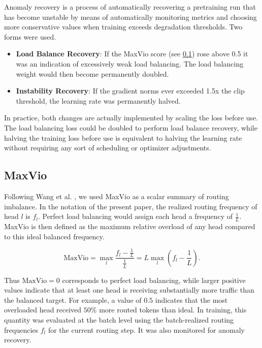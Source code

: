 \documentclass[11pt]{article}
\begin{document}
Anomaly recovery is a process of automatically recovering a pretraining run that has become unstable by means of automatically monitoring metrics and choosing more conservative values when training exceeds degradation thresholds. Two forms were used.

\begin{itemize}
    \item \textbf{Load Balance Recovery}: If the MaxVio score (see \ref{app:maxvio}) rose above 0.5 it was an indication of excessively weak load balancing. The load balancing weight would then become permanently doubled.
    \item \textbf{Instability Recovery}: If the gradient norms ever exceeded 1.5x the clip threshold, the learning rate was permanently halved.
\end{itemize}

In practice, both changes are actually implemented by scaling the loss before use. The load balancing loss could be doubled to perform load balance recovery, while halving the training loss before use is equivalent to halving the learning rate without requiring any sort of scheduling or optimizer adjustments.

\subsection{MaxVio}
\label{app:maxvio}

Following Wang et al. \cite{wang2024auxiliarylossfree}, we used MaxVio as a scalar summary of routing imbalance. In the notation of the present paper, the realized routing frequency of head $l$ is $f_l$. Perfect load balancing would assign each head a frequency of $\frac{1}{L}$. MaxVio is then defined as the maximum relative overload of any head compared to this ideal balanced frequency.

\[
\mathrm{MaxVio}
=
\max_l
\frac{f_l - \frac{1}{L}}{\frac{1}{L}}
=
L \max_l \left( f_l - \frac{1}{L} \right).
\]

Thus $\mathrm{MaxVio}=0$ corresponds to perfect load balancing, while larger positive values indicate that at least one head is receiving substantially more traffic than the balanced target. For example, a value of $0.5$ indicates that the most overloaded head received $50\%$ more routed tokens than ideal. In training, this quantity was evaluated at the batch level using the batch-realized routing frequencies $f_l$ for the current routing step. It was also monitored for anomaly recovery.
\end{document}

